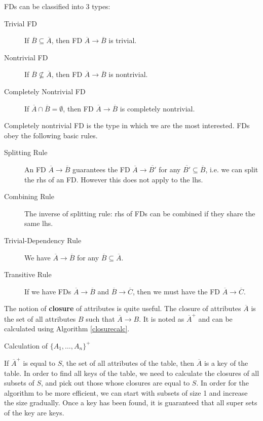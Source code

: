 FDs can be classified into 3 types:
\begin{description}
\item[Trivial FD]If ${\overline{B}\subseteq\overline{A}}$, then FD ${\overline{A}\rightarrow\overline{B}}$ is trivial.
\item[Nontrivial FD]If ${\overline{B}\not\subseteq\overline{A}}$, then FD ${\overline{A}\rightarrow\overline{B}}$ is nontrivial.
\item[Completely Nontrivial FD]If ${\overline{A}\cap\overline{B}=\emptyset}$, then FD ${\overline{A}\rightarrow\overline{B}}$ is completely nontrivial.
\end{description}
Completely nontrivial FD is the type in which we are the most interested. FDs obey the following basic rules.
\begin{description}
\item[Splitting Rule]An FD ${\overline{A}\rightarrow\overline{B}}$ guarantees the FD ${\overline{A}\rightarrow\overline{B'}}$ for any ${\overline{B'}\subseteq\overline{B}}$, i.e. we can split the rhs of an FD. However this does not apply to the lhs.
\item[Combining Rule]The inverse of splitting rule: rhs of FDs can be combined if they share the same lhs.
\item[Trivial-Dependency Rule]We have ${\overline{A}\rightarrow\overline{B}}$ for any  ${\overline{B}\subseteq\overline{A}}$.
\item[Transitive Rule]If we have FDs ${\overline{A}\rightarrow\overline{B}}$ and ${\overline{B}\rightarrow\overline{C}}$, then we must have the FD ${\overline{A}\rightarrow\overline{C}}$.
\end{description}
The notion of \textbf{closure} of attributes is quite useful. The closure of attributes $\overline{{A}}$ is the set of all attributes $B$ such that ${\overline{A}\rightarrow B}$. It is noted as ${\overline{A}^+}$ and can be calculated using Algorithm \eqref{closurecalc}.
\begin{algorithm}[ht]
\caption{Calculation of ${\{A_1,\dots,A_n\}^+}$}\label{closurecalc}
\begin{algorithmic}[1]
\Repeat
{}
\EndIf
{}
\end{algorithmic}
\end{algorithm}

If ${\overline{A}^+}$ is equal to $S$, the set of all attributes of the table, then ${\overline{A}}$ is a key of the table. In order to find all keys of the table, we need to calculate the closures of all subsets of $S$, and pick out those whose closures are equal to $S$. In order for the algorithm to be more efficient, we can start with subsets of size 1 and increase the size gradually. Once a key has been found, it is guaranteed that all super sets of the key are keys.

